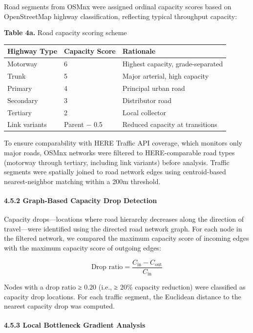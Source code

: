 Road segments from OSMnx were assigned ordinal capacity scores based on OpenStreetMap highway classification, reflecting typical throughput capacity:

\textbf{Table 4a.} Road capacity scoring scheme

\begin{longtable}[]{@{}lll@{}}
\toprule\noalign{}
Highway Type & Capacity Score & Rationale \\
\midrule\noalign{}
\endhead
\bottomrule\noalign{}
\endlastfoot
Motorway & 6 & Highest capacity, grade-separated \\
Trunk & 5 & Major arterial, high capacity \\
Primary & 4 & Principal urban road \\
Secondary & 3 & Distributor road \\
Tertiary & 2 & Local collector \\
Link variants & Parent − 0.5 & Reduced capacity at transitions \\
\end{longtable}

To ensure comparability with HERE Traffic API coverage, which monitors only major roads, OSMnx networks were filtered to HERE-comparable road types (motorway through tertiary, including link variants) before analysis. Traffic segments were spatially joined to road network edges using centroid-based nearest-neighbor matching within a 200m threshold.

\paragraph{4.5.2 Graph-Based Capacity Drop Detection}\label{graph-based-capacity-drop-detection}

Capacity drops---locations where road hierarchy decreases along the direction of travel---were identified using the directed road network graph. For each node in the filtered network, we compared the maximum capacity score of incoming edges with the maximum capacity score of outgoing edges:

\[\text{Drop ratio} = \frac{C_{\text{in}} - C_{\text{out}}}{C_{\text{in}}}\]

Nodes with a drop ratio ≥ 0.20 (i.e., ≥ 20\% capacity reduction) were classified as capacity drop locations. For each traffic segment, the Euclidean distance to the nearest capacity drop was computed.

\paragraph{4.5.3 Local Bottleneck Gradient Analysis}\label{local-bottleneck-gradient-analysis}

